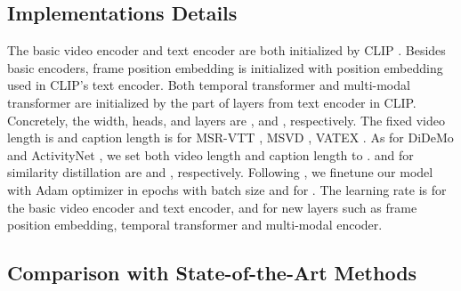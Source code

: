 \subsection{Implementations Details}
The basic video encoder and text encoder are both initialized by CLIP \cite{radford2021clip}. Besides basic encoders, frame position embedding is initialized with position embedding used in CLIP's text encoder. Both temporal transformer and multi-modal transformer are initialized by the part of layers from text encoder in CLIP. Concretely, the width, heads, and layers are ,  and , respectively. The fixed video length is  and caption length is  for MSR-VTT \cite{xu2016msrvtt}, MSVD \cite{chen2011collecting}, VATEX \cite{wang2019vatex}. As for DiDeMo \cite{anne2017localizing} and ActivityNet \cite{krishna2017dense}, we set both video length and caption length to .  and  for similarity distillation are  and , respectively. Following \cite{luo2021clip4clip}, we finetune our model with Adam optimizer in  epochs with  batch size and  for . The learning rate is  for the basic video encoder and text encoder, and  for new layers such as frame position embedding, temporal transformer and multi-modal encoder.

\subsection{Comparison with State-of-the-Art Methods}

